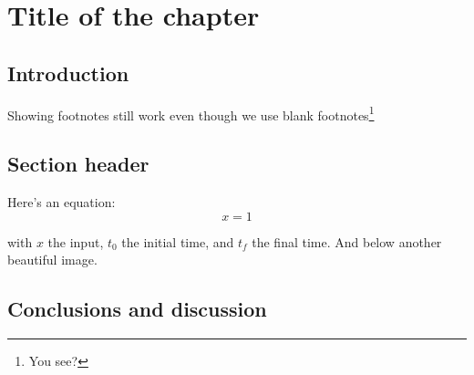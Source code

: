 \chapter{Title of the chapter}\label{chap: chapter 1}



\chapterabstract{\lipsum[1]}

\section{Introduction} \label{sec: chap2 intro}
Showing footnotes still work even though we use blank footnotes\footnote{You see?}
\lipsum[5-7]

\section{Section header}\label{sec: chap2 section header}

Here's an equation:
\begin{equation}\label{eq: chap2 vector field} 
x = 1
\end{equation}

with $x$ the input, $t_0$ the initial time, and $t_f$ the final time. 
And below another beautiful image.



\section{Conclusions and discussion}
\label{sec: chap2 conclusion}

\lipsum[10-13]


